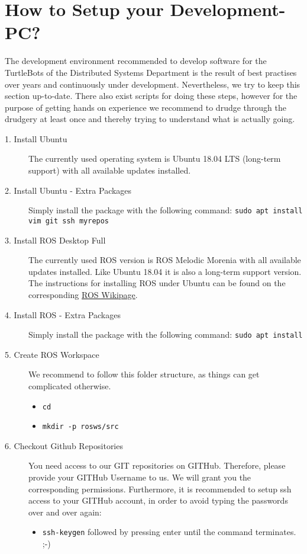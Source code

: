 \section{How to Setup your Development-PC?}
\label{sec:SetupPC}

The development environment recommended to develop software for the TurtleBots of the Distributed Systems Department is the result of best practises over years and continuously under development. Nevertheless, we try to keep this section up-to-date. There also exist scripts for doing these steps, however for the purpose of getting hands on experience we recommend to drudge through the drudgery at least once and thereby trying to understand what is actually going.

\begin{description}
	\item[1. Install Ubuntu] The currently used operating system is Ubuntu 18.04 LTS (long-term support) with all available updates installed.
	\item[2. Install Ubuntu - Extra Packages] Simply install the package with the following command: \verb#sudo apt install vim git ssh myrepos#
	\item[3. Install ROS Desktop Full] The currently used ROS version is ROS Melodic Morenia with all available updates installed. Like Ubuntu 18.04 it is also a long-term support version. The instructions for installing ROS under Ubuntu can be found on the corresponding \href{http://wiki.ros.org/melodic/Installation/Ubuntu}{ROS Wikipage}.
	\item[4. Install ROS - Extra Packages] Simply install the package with the following command: \verb#sudo apt install #
	\item[5. Create ROS Workspace] We recommend to follow this folder structure, as things can get complicated otherwise. 
	\begin{itemize}
		\item \verb#cd#
		\item \verb#mkdir -p rosws/src#
	\end{itemize}
	\item[6. Checkout Github Repositories] You need access to our GIT repositories on GITHub. Therefore, please provide your GITHub Username to us. We will grant you the corresponding permissions. Furthermore, it is recommended to setup ssh access to your GITHub account, in order to avoid typing the passwords over and over again:
	\begin{itemize}
		\item \verb#ssh-keygen# followed by pressing enter until the command terminates. ;-)

\end{itemize}
\end{description}
